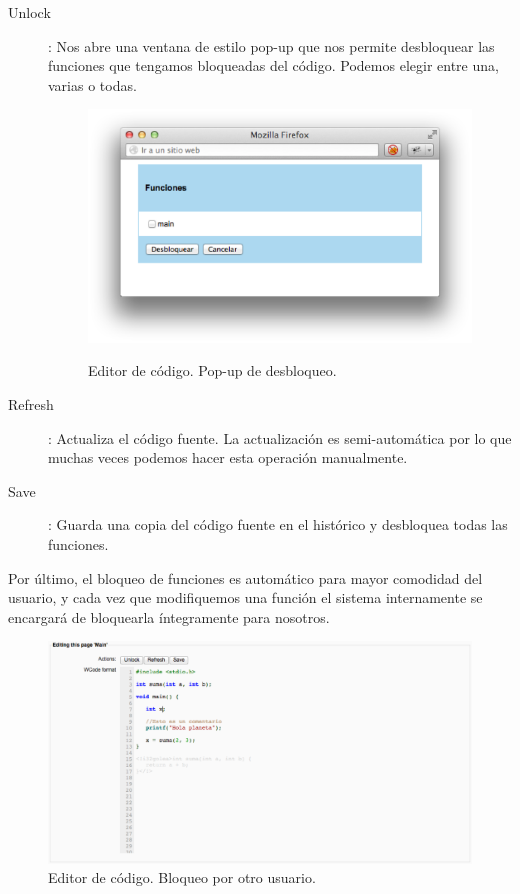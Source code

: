 \begin{description}
	\item[Unlock]: Nos abre una ventana de estilo pop-up que nos permite desbloquear las funciones que tengamos bloqueadas del código. Podemos elegir entre una, varias o todas.

\begin{figure}[h]
	\begin{center}
	\label{eunlock.eps}
	\includegraphics[scale=0.50]{./img/eunlock.eps}
	\caption{Editor de código. Pop-up de desbloqueo.}
	\end{center}
\end{figure}
	
	\item[Refresh]: Actualiza el código fuente. La actualización es semi-automática por lo que muchas veces podemos hacer esta operación manualmente.
	\item[Save]: Guarda una copia del código fuente en el histórico y desbloquea todas las funciones.
\end{description}

\newpage

Por último, el bloqueo de funciones es automático para mayor comodidad del usuario, y cada vez que modifiquemos una función el sistema internamente se encargará de bloquearla íntegramente para nosotros.

\begin{figure}[h]
	\label{fig:eedit2}
	\includegraphics[width=\textwidth]{./img/eedit2.eps}
	\caption{Editor de código. Bloqueo por otro usuario.}
\end{figure}

